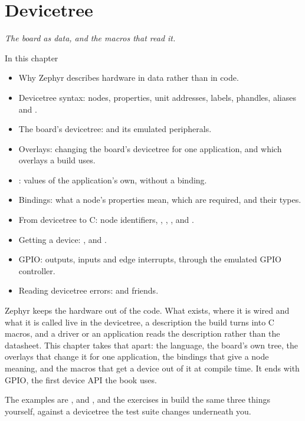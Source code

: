 
\chapter{Devicetree}
\label{c2:ch:devicetree}\label{c2:ch}

{\large\itshape The board as data, and the macros that read it.\par}

\begin{chapterbox}{In this chapter}
\begin{itemize}
  \item Why Zephyr describes hardware in data rather than in code.
  \item Devicetree syntax: nodes, properties, unit addresses, labels, phandles, aliases and .
  \item The board’s devicetree:  and its emulated peripherals.
  \item Overlays: changing the board’s devicetree for one application, and which overlays a build uses.
  \item {}: values of the application’s own, without a binding.
  \item Bindings: what a node’s properties mean, which are required, and their types.
  \item From devicetree to C: node identifiers, , , ,
    and .
  \item Getting a device: ,  and .
  \item GPIO: outputs, inputs and edge interrupts, through the emulated GPIO controller.
  \item Reading devicetree errors:  and friends.
\end{itemize}
\end{chapterbox}

Zephyr keeps the hardware out of the code. What exists, where it is wired and what it is called live
in the devicetree, a description the build turns into C macros, and a driver or an application reads
the description rather than the datasheet. This chapter takes that apart: the language, the board's
own tree, the overlays that change it for one application, the bindings that give a node meaning,
and the macros that get a device out of it at compile time. It ends with GPIO, the first device API
the book uses.

The examples are ,  and
, and the exercises in  build the same
three things yourself, against a devicetree the test suite changes underneath you.




